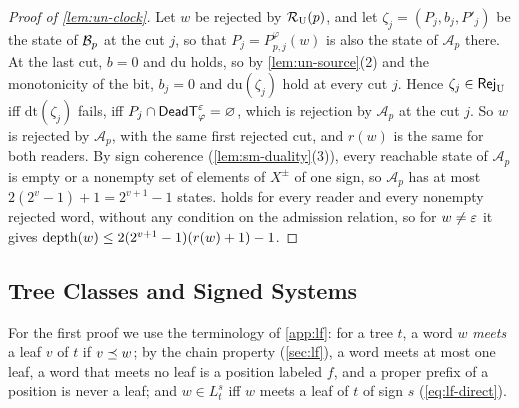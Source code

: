 \begin{proof}[Proof of \cref{lem:un-clock}]
Let $w$ be rejected by $\mathcal R_{\mathrm U}(p)$, and let $\zeta_j=(P_j,b_j,P'_j)$ be the state
of $\mathcal B_p$ at the cut $j$, so that $P_j=P^\varphi_{p,j}(w)$ is also the state
of $\mathcal A_p$ there. At the last cut, $b=0$ and $\mathrm{du}$ holds, so by
\cref{lem:un-source}(2) and the monotonicity of the bit, $b_j=0$ and
$\mathrm{du}(\zeta_j)$ hold at every cut $j$. Hence $\zeta_j\in\mathsf{Rej}_{\mathrm U}$
iff $\mathrm{dt}(\zeta_j)$ fails, iff
$P_j\cap\mathsf{DeadT}^\varepsilon_\varphi=\varnothing$, which is rejection by $\mathcal A_p$
at the cut $j$. So $w$ is rejected by $\mathcal A_p$, with the same first
rejected cut, and $r(w)$ is the same for both readers. By sign coherence
(\cref{lem:sm-duality}(3)), every reachable state of $\mathcal A_p$ is empty or
a nonempty set of elements of $X^\pm$ of one sign, so $\mathcal A_p$ has at
most $2(2^v-1)+1=2^{v+1}-1$ states.  holds for every reader
and every nonempty rejected word, without any condition on the admission
relation, so for $w\ne\varepsilon$ it gives
$\operatorname{depth}(w)\le2(2^{v+1}-1)(r(w)+1)-1$.
\end{proof}

\subsection{Tree Classes and Signed Systems}\label{app:cx-facts}

For the first proof we use the terminology of \cref{app:lf}: for a tree $t$, a
word $w$ \emph{meets} a leaf $v$ of $t$ if $v\preceq w$; by the chain property
(\cref{sec:lf}), a word meets at most one leaf, a word that meets no leaf is a
position labeled $f$, and a proper prefix of a position is never a leaf; and
$w\in L^s_t$ iff $w$ meets a leaf of $t$ of sign $s$ (\cref{eq:lf-direct}).

